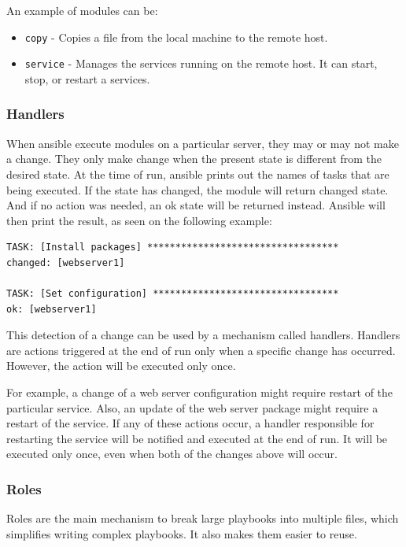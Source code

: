 An example of modules can be:
\begin{itemize}
  \item{\texttt{copy} - Copies a file from the local machine to the remote host.}
  \item{\texttt{service} - Manages the services running on the remote host. It can start, stop, or restart a services.}
\end{itemize}


\subsubsection*{Handlers}

When ansible execute modules on a particular server, they may or may not make a change. They only make change when the present state is different from the desired state. At the time of run, ansible prints out the names of tasks that are being executed. If the state has changed, the module will return changed state. And if no action was needed, an ok state will be returned instead. Ansible will then print the result, as seen on the following example:

\begin{lstlisting}
TASK: [Install packages] **********************************
changed: [webserver1]

TASK: [Set configuration] *********************************
ok: [webserver1]
\end{lstlisting}

This detection of a change can be used by a mechanism called handlers. \cite{UpAndRunning} Handlers are actions triggered at the end of run only when a specific change has occurred. However, the action will be executed only once.

For example, a change of a web server configuration might require restart of the particular service. Also, an update of the web server package might require a restart of the service. If any of these actions occur, a handler responsible for restarting the service will be notified and executed at the end of run. It will be executed only once, even when both of the changes above will occur.

\subsubsection*{Roles}

Roles are the main mechanism to break large playbooks into multiple files, which simplifies writing complex playbooks. It also makes them easier to reuse.

